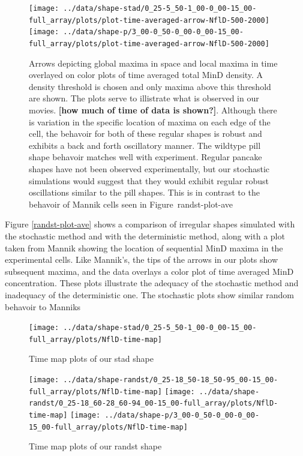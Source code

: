 \documentclass[letterpaper,twocolumn,amsmath,amssymb,pre]{revtex4-1}
\newcommand{\red}[1]{{\bf \color{red} #1}}
\newcommand{\fixme}[1]{\red{[#1]}}
\begin{document}
\begin{figure}
  \texttt{[image: ../data/shape-stad/0\_25-5\_50-1\_00-0\_00-15\_00-full\_array/plots/plot-time-averaged-arrow-NflD-500-2000]}
  \texttt{[image: ../data/shape-p/3\_00-0\_50-0\_00-0\_00-15\_00-full\_array/plots/plot-time-averaged-arrow-NflD-500-2000]}
  \caption{Arrows depicting global maxima in space and local maxima in
    time overlayed on color plots of time averaged total MinD
    density. A density threshold is chosen and only maxima above this
    threshold are shown. The plots serve to illistrate what is
    observed in our movies. \fixme{how much of time of data is
      shown?}.  Although there is variation in the specific location
    of maxima on each edge of the cell, the behavoir for both of these
    regular shapes is robust and exhibits a back and forth oscillatory
    manner.  The wildtype pill shape behavoir matches well with
    experiment.  Regular pancake shapes have not been observed
    experimentally, but our stochastic simulations would suggest that
    they would exhibit regular robust oscillations similar to the pill
    shapes.  This is in contrast to the behavoir of Mannik cells seen
    in Figure~{randst-plot-ave}}
  \label{arrow-pill-stadium}
\end{figure}



Figure \ref{randst-plot-ave} shows a comparison of irregular shapes
simulated with the stochastic method and with the deterministic
method, along with a plot taken from Mannik showing the location of
sequential MinD maxima in the experimental cells.  Like Mannik's, the
tips of the arrows in our plots show subsequent maxima, and the data
overlays a color plot of time averaged MinD concentration.  These
plots illustrate the adequacy of the stochastic method and inadequacy
of the deterministic one.  The stochastic plots show similar random behavoir to Manniks






\begin{figure}
  \texttt{[image: ../data/shape-stad/0\_25-5\_50-1\_00-0\_00-15\_00-full\_array/plots/NflD-time-map]}
  \caption{Time map plots of our stad shape}
  \label{time-maps-stad}
\end{figure}


\begin{figure}
  \texttt{[image: ../data/shape-randst/0\_25-18\_50-18\_50-95\_00-15\_00-full\_array/plots/NflD-time-map]}
  \texttt{[image: ../data/shape-randst/0\_25-18\_60-28\_60-94\_00-15\_00-full\_array/plots/NflD-time-map]}
  \texttt{[image: ../data/shape-p/3\_00-0\_50-0\_00-0\_00-15\_00-full\_array/plots/NflD-time-map]}
  \caption{Time map plots of our randst shape}
  \label{time-maps-randst}
\end{figure}
\end{document}
